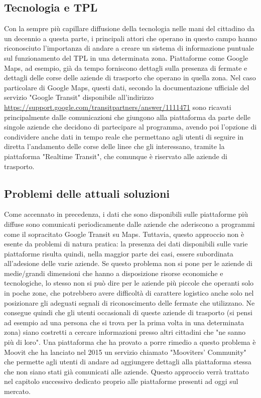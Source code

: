     \subsection{Tecnologia e TPL}
    Con la sempre più capillare diffusione della tecnologia nelle mani del cittadino da un decennio a questa parte, i principali attori che operano in questo campo hanno riconosciuto l'importanza di andare a creare un sistema di informazione puntuale sul funzionamento del TPL in una determinata zona. Piattaforme come Google Maps, ad esempio, già da tempo forniscono dettagli sulla presenza di fermate e dettagli delle corse delle aziende di trasporto che operano in quella zona. 
    Nel caso particolare di Google Maps, questi dati, secondo la documentazione ufficiale del servizio "Google Transit" disponibile all'indirizzo \url{https://support.google.com/transitpartners/answer/1111471} sono ricavati principalmente dalle comunicazioni che giungono alla piattaforma da parte delle singole aziende che decidono di partecipare al programma, avendo poi l'opzione di condividere anche dati in tempo reale che permettano agli utenti di seguire in diretta l'andamento delle corse delle linee che gli interessano, tramite la piattaforma "Realtime Transit", che comunque è riservato alle aziende di trasporto.

    \subsection{Problemi delle attuali soluzioni}
    Come accennato in precedenza, i dati che sono disponibili sulle piattaforme più diffuse sono comunicati periodicamente dalle aziende che aderiscono a programmi come il sopracitato Google Transit su Maps. 
    Tuttavia, questo approccio non è esente da problemi di natura pratica: la presenza dei dati disponibili sulle varie piattaforme risulta quindi, nella maggior parte dei casi, essere subordinata all'adesione delle varie aziende. Se questo problema non si pone per le aziende di medie/grandi dimensioni che hanno a disposizione risorse economiche e tecnologiche, lo stesso non si può dire per le aziende più piccole che operanti solo in poche zone, che potrebbero avere difficoltà di carattere logistico anche solo nel posizionare gli adeguati segnali di riconoscimento delle fermate che utilizzano.
    Ne consegue quindi che gli utenti occasionali di queste aziende di trasporto (si pensi ad esempio ad una persona che si trova per la prima volta in una determinata zona) siano costretti a cercare informazioni presso altri cittadini che "ne sanno più di loro".
    Una piattaforma che ha provato a porre rimedio a questo problema è Moovit che ha lanciato nel 2015 un servizio chiamato "Mooviters' Community" che permette agli utenti di andare ad aggiungere dettagli alla piattaforma stessa che non siano stati già comunicati alle aziende. Questo approccio verrà trattato nel capitolo successivo dedicato proprio alle piattaforme presenti ad oggi sul mercato. 

